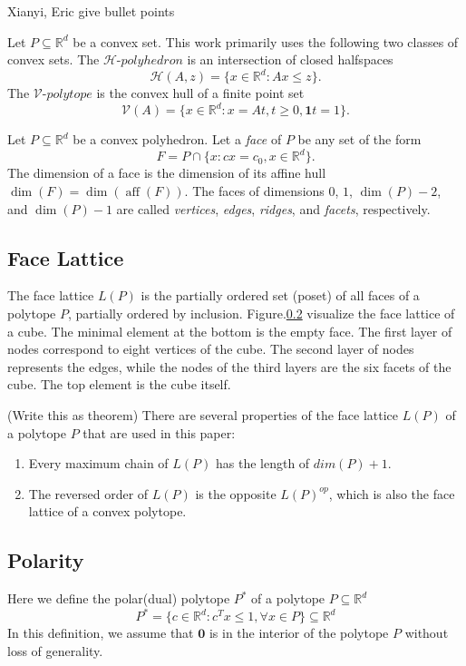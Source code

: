\documentclass[conference]{IEEEtran}
\DeclareMathOperator{\aff}{aff}
\newcommand{\TODO}[1]{{\color{red} {{#1}}  }}
\begin{document}
\TODO{Xianyi, Eric give bullet points}

Let $P \subseteq \mathbb{R}^d$ be a convex set. This work primarily uses the
following two classes of convex sets. The $\mathcal{H}\text{-}polyhedron$ is an
intersection of closed halfspaces
\begin{equation}
    \mathcal{H}(A,z) = \{x \in \mathbb{R}^d : Ax \leq z\}.
\end{equation}
The $\mathcal{V}\text{-}polytope$ is the convex hull of a finite point set
\begin{equation}
    \mathcal{V}(A) = \{x \in \mathbb{R}^d : x = At, t \geq 0, \mathbf{1}t = 1\}.
\end{equation}

Let $P \subseteq \mathbb{R}^d$ be a convex polyhedron. Let a \textit{face} of
$P$ be any set of the form 
\begin{equation}
    F = P \cap \{x : cx = c_0, x \in \mathbb{R}^d\}.
\end{equation}
The dimension of a face is the dimension of its affine hull $\dim(F) =
\dim(\aff(F))$. The faces of dimensions $0$, $1$, $\dim(P)-2$, and $\dim(P)-1$
are called \textit{vertices}, \textit{edges}, \textit{ridges}, and
\textit{facets}, respectively.

\subsection{Face Lattice}
The face lattice $L(P)$ is the partially ordered set (poset) of all faces of a polytope $P$, partially ordered by inclusion. Figure.\ref{} visualize the face lattice of a cube. The minimal element at the bottom is the empty face. The first layer of nodes correspond to eight vertices of the cube. The second layer of nodes represents the edges, while the nodes of the third layers are the six facets of the cube. The top element is the cube itself. 

(Write this as theorem) There are several properties of the face lattice $L(P)$ of a polytope $P$ that are used in this paper:
\begin{enumerate}
    \item Every maximum chain of $L(P)$ has the length of $dim(P) + 1$. 
    \item The reversed order of $L(P)$ is the opposite $L(P)^{op}$, which is also the face lattice of a convex polytope.
\end{enumerate}


\subsection{Polarity}
Here we define the polar(dual) polytope $P^*$ of a polytope $P \subseteq \mathbb{R}^d$ 
\begin{equation}
    P^* = \{c \in \mathbb{R}^d: c^T x \leq 1, \forall x \in P\} \subseteq \mathbb{R}^d
\end{equation}
In this definition, we assume that $\mathbf{0}$ is in the interior of the polytope $P$ without loss of generality.   
\end{document}
